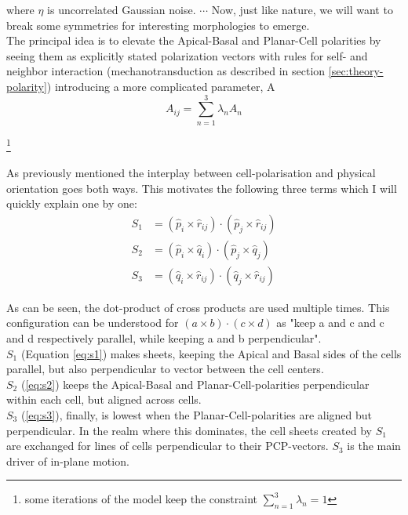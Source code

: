 where $\eta$ is uncorrelated Gaussian noise.
$\cdots$
Now, just like nature, we will want to break some symmetries for interesting morphologies to emerge.\\
The principal idea is to elevate the Apical-Basal and Planar-Cell polarities by seeing them as explicitly stated polarization vectors with rules for self- and neighbor interaction (mechanotransduction as described in section \ref{sec:theory-polarity})
 introducing a more complicated parameter, A
\begin{equation}
    A_{ij}=\sum_{n=1}^{3}\lambda_n A_n
\end{equation}

\footnote{some iterations of the model keep the constraint $\sum_{n=1}^{3}\lambda_n=1$} 

As previously mentioned the interplay between cell-polarisation and physical orientation goes both ways. This motivates the following three terms which I will quickly explain one by one:
\begin{subequations}
\begin{align}
S_1&=\left(\hat{p}_i \times \hat{r}_{i j}\right) \cdot\left(\hat{p}_j \times \hat{r}_{i j}\right)\label{eq:s1}\\
S_2&=\left(\hat{p}_i \times \hat{q}_{i}\right) \cdot\left(\hat{p}_j \times \hat{q}_{j}\right)\label{eq:s2}\\
S_3&=\left(\hat{q}_i \times \hat{r}_{i j}\right) \cdot\left(\hat{q}_j \times \hat{r}_{i j}\right)\label{eq:s3}
\end{align}
\end{subequations}

As can be seen, the dot-product of cross products are used multiple times. This configuration can be understood for $\left(a \times b\right) \cdot\left(c \times d\right)$ as "keep a and c and c and d respectively parallel, while keeping a and b perpendicular".\\

$S_1$ (Equation \ref{eq:s1}) makes sheets, keeping the Apical and Basal sides of the cells parallel, but also perpendicular to vector between the cell centers. \\
$S_2$ (\ref{eq:s2}) keeps the Apical-Basal and Planar-Cell-polarities perpendicular within each cell, but aligned across cells.\\
$S_3$ (\ref{eq:s3}), finally, is lowest when the Planar-Cell-polarities are aligned but perpendicular. In the realm where this dominates, the cell sheets created by $S_1$ are exchanged for lines of cells perpendicular to their PCP-vectors. $S_3$ is the main driver of in-plane motion.\\

